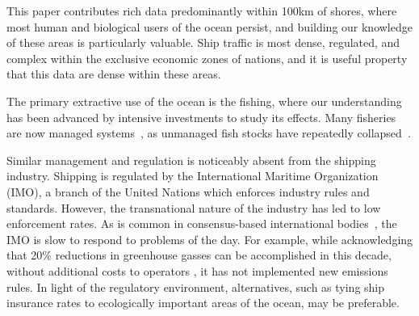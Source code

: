  This paper contributes rich data predominantly within 100km of shores, where most human and biological users of the ocean persist, and building our knowledge of these areas is particularly valuable. Ship traffic is most dense, regulated, and complex within the exclusive economic zones of nations, and it is useful property that this data are dense within these areas.


The primary extractive use of the ocean is the fishing, where our understanding has been advanced by intensive investments to study its effects. %
Many fisheries are now managed systems~\citep{worm2009rebuilding}, as unmanaged fish stocks have repeatedly collapsed~\citep{costello2012status}. %

Similar management and regulation is noticeably absent from the shipping industry.
  Shipping is regulated by the International Maritime Organization (IMO), a branch of the United Nations which enforces industry rules and standards. However, the transnational nature of the industry has led to low enforcement rates. As is common in consensus-based international bodies~\citep{cogan2009representation}, the IMO is slow to respond to problems of the day. 
  For example, while acknowledging that 20\% reductions in greenhouse gasses can be accomplished in this decade, without additional costs to operators \citep{imo2009}, it has not implemented new emissions rules.  In light of the regulatory environment, alternatives, such as tying ship insurance rates to ecologically important areas of the ocean, may be preferable.

